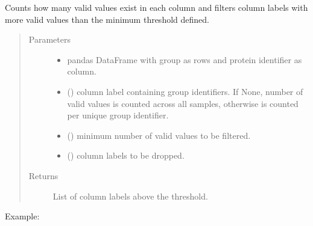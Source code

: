 \documentclass[letterpaper,10pt,english]{sphinxmanual}
\begin{document}
\begin{fulllineitems}
\label{\detokenize{_autosummary/analytics_core.analytics:analytics_core.analytics.analytics.extract_number_missing}}
Counts how many valid values exist in each column and filters column labels with more valid values than the minimum threshold defined.
\begin{quote}\begin{description}
\item[{Parameters}] \leavevmode\begin{itemize}
\item {} 
 \textendash{} pandas DataFrame with group as rows and protein identifier as column.

\item {} 
 () \textendash{} column label containing group identifiers. If None, number of valid values is counted across all samples, otherwise is counted per unique group identifier.

\item {} 
 () \textendash{} minimum number of valid values to be filtered.

\item {} 
 () \textendash{} column labels to be dropped.

\end{itemize}

\item[{Returns}] \leavevmode
List of column labels above the threshold.

\end{description}\end{quote}

Example:

\begin{sphinxVerbatim}[commandchars=\\\{\}]
    \PYG{p}{[}\PYG{p}{]} 
\end{sphinxVerbatim}

\end{fulllineitems}
\end{document}
